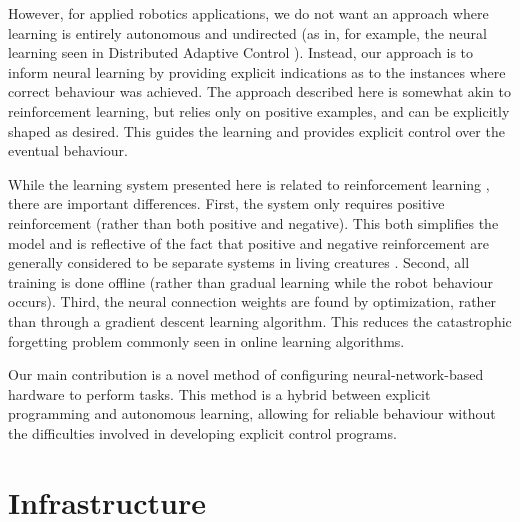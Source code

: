 \documentclass{frontiersSCNS}
\begin{document}
However, for applied robotics applications, we do not want an approach where
learning is entirely autonomous and undirected (as in, for example, the neural
learning seen in Distributed Adaptive Control \citep{verschure2012distributed}). 
Instead, our approach is to inform neural learning by providing explicit
indications as to the instances where correct behaviour was achieved.  The 
approach described here is somewhat akin to reinforcement learning, but relies
only on positive examples, and can be explicitly shaped as desired.  This 
guides the learning and provides explicit control over the eventual behaviour. 

While the learning system presented here is
related to reinforcement learning \citep{suttonbarto1998}, there are important differences.  First,
the system only requires positive reinforcement (rather than both positive
and negative).  This both simplifies the model and is reflective of the
fact that positive and negative reinforcement are generally considered
to be separate systems in living creatures \citep{boureau2010}.  Second, all training is done offline (rather than gradual learning while the robot behaviour occurs).  Third, the neural connection weights are found by
optimization, rather than through a gradient descent learning algorithm.
This reduces the catastrophic forgetting problem commonly seen in online
learning algorithms.

Our main contribution is a novel method of configuring
neural-network-based hardware to perform tasks.  This method is a hybrid 
between explicit programming and autonomous learning, allowing for reliable
behaviour without the difficulties involved in developing explicit control
programs.

\section{Infrastructure}
\label{infrastructure}
\end{document}
